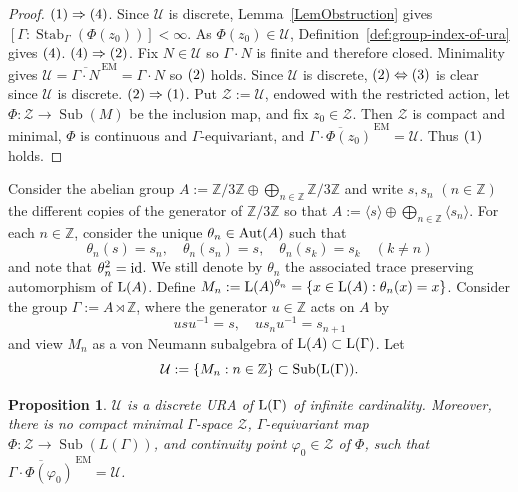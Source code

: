 \documentclass[12pt]{amsart} %
\theoremstyle{plain}
\newtheorem{proposition}[theorem]{Proposition}
\theoremstyle{definition}
\newcommand{\Z}{\mathbb{Z}}
\newcommand{\id}{{\rm id}}
\newcommand{\Ucal}{\mathcal{U}}
\DeclareMathOperator{\Sub}{Sub}
\begin{document}
\begin{proof}
${\rm(1)}\Rightarrow{\rm(4)}$. Since $\mathcal U$ is discrete,
Lemma~\ref{LemObstruction} gives $[\Gamma:\operatorname{Stab}_\Gamma(\Phi(z_0))]<\infty$. As $\Phi(z_0)\in\mathcal U$, Definition~\ref{def:group-index-of-ura} gives ${\rm(4)}$.
\medskip
\noindent${\rm(4)}\Rightarrow{\rm(2)}$. Fix $N\in\mathcal U$ so $\Gamma\cdot N$ is finite
and therefore closed. Minimality gives
$\mathcal U=\overline{\Gamma\cdot N}^{\,\mathrm{EM}}=\Gamma\cdot N$ so ${\rm(2)}$ holds. Since $\mathcal U$ is discrete,
\medskip
\noindent${\rm(2)}\Leftrightarrow{\rm(3)}$ is clear since $\Ucal$ is discrete.
\medskip
\noindent${\rm(2)}\Rightarrow{\rm(1)}$. Put $\mathcal Z:=\mathcal U$, endowed with the
restricted action, let $\Phi:\mathcal Z\to\Sub(M)$ be the inclusion map, and
fix $z_0\in\mathcal Z$. Then $\mathcal Z$ is compact and minimal, $\Phi$ is
continuous and $\Gamma$-equivariant, and $\overline{\Gamma\cdot\Phi(z_0)}^{\,\mathrm{EM}}=\mathcal U$. Thus ${\rm(1)}$ holds.\end{proof}
\iffalse
\noindent Consider the abelian group $A:=\Z/3\Z\oplus \bigoplus_{n\in\mathbb Z}\Z/{3\Z}$ and write $s,s_n$ $(n\in\Z)$ the different copies of the generator of $\Z/3\Z$ so that $A:=\langle s\rangle\oplus\bigoplus_{n\in\mathbb Z}\langle s_n\rangle$. For each $n\in\Z$, consider the unique $\theta_n\in{\rm Aut}(A)$ such that
$$\theta_n(s)=s_n,\quad\theta_n(s_n)=s,\quad\theta_n(s_k)=s_k\quad(k\neq n)$$
and note that $\theta_n^2=\id$. We still denote by $\theta_n$ the associated trace preserving automorphism of ${\rm L}(A)$. Define $M_n:={\rm L}(A)^{\theta_n}=\{x\in{\rm L}(A):\theta_n(x)=x\}$. Consider the group $\Gamma:=A\rtimes\Z$, where the generator $u\in\Z$ acts on $A$ by
$$u su^{-1}=s,\quad u s_n u^{-1}=s_{n+1}$$
and view \(M_n\) as a von Neumann subalgebra of ${\rm L}(A)\subset{\rm L}(\Gamma)$. Let
$$\mathcal{U}:=\{M_n:n\in\Z\}\subset\Sub({\rm L}(\Gamma)).$$
\begin{proposition}\label{prop:DiscreteExoticURA}
{$\Ucal$ is a discrete URA of ${\rm L}(\Gamma)$ of infinite cardinality. Moreover, there is no compact minimal $\Gamma$-space $\mathcal{Z}$, $\Gamma$-equivariant map $\Phi:\mathcal{Z}\to\Sub(L(\Gamma))$, and continuity point $\varphi_0\in\mathcal{Z}$ of $\Phi$, such that $\overline{\Gamma\cdot\Phi(\varphi_0)}^{\,\mathrm{EM}}=\Ucal$.}
\end{proposition}
\end{document}
